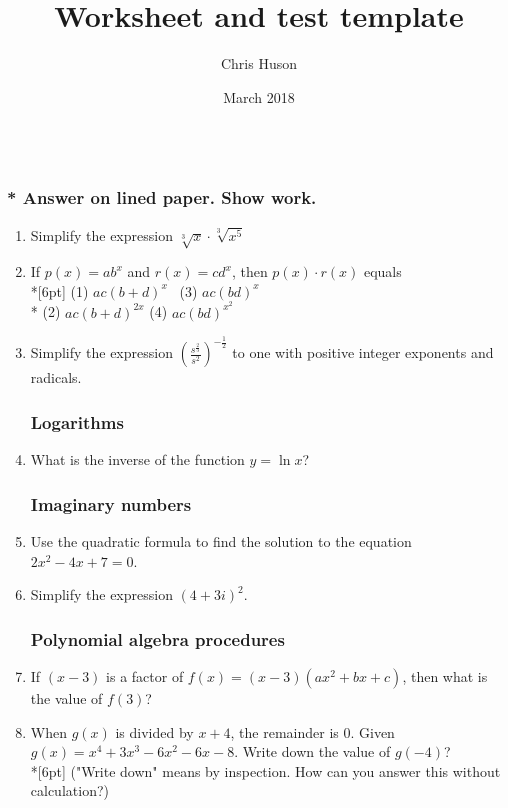 \documentclass[12pt, oneside]{article}
\title{Worksheet and test template}
\author{Chris Huson}
\date{March 2018}
\begin{document}
\subsubsection*{\\* Answer on lined paper. Show work.}

\begin{enumerate}
\subsubsection*{Rational exponents and radicals}

\item Simplify the expression $\sqrt[3]{x} \cdot \sqrt[3]{x^5}$

\item If $p(x)=ab^x$ and $r(x)=cd^x$, then $p(x) \cdot r(x)$ equals \\*[6pt]
(1) $ac(b+d)^x$ \, \qquad (3) $ac(bd)^x$\\*
(2) $ac(b+d)^{2x}$ \qquad (4) $ac(bd)^{x^2}$


\item Simplify the expression $\displaystyle \left( \frac{s^{\frac{2}{3}}}{s^2} \right)^{-\frac{1}{2}}$ to one with positive integer exponents and radicals.

\subsubsection*{Logarithms}
\item What is the inverse of the function $y=\ln x$?


\subsubsection*{Imaginary numbers}
\item Use the quadratic formula to find the solution to the equation $2x^2-4x+7=0$.
\item Simplify the expression $(4+3i)^2$.


\subsubsection*{Polynomial algebra procedures}

\item If $(x-3)$ is a factor of $f(x)=(x-3)(ax^2+bx+c)$, then what is the value of $f(3)$?

\item When $g(x)$ is divided by $x+4$, the remainder is 0. Given $g(x)=x^4+3x^3- 6x^2- 6x-8$. Write down the value of $g(-4)$?\\*[6pt]
("Write down" means by inspection. How can you answer this without calculation?)


\end{enumerate}
\end{document}
